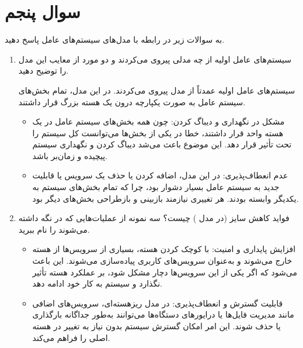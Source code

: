 \section{سوال پنجم}

به سوالات زیر در رابطه با مدل‌های سیستم‌های عامل پاسخ دهید.

\begin{enumerate}
	\item 
	سیستم‌های عامل اولیه از چه مدلی پیروی می‌کردند و دو مورد از معایب این مدل را توضیح دهید.
	\begin{qsolve}
		سیستم‌های عامل اولیه عمدتاً از مدل  پیروی می‌کردند. در این مدل، تمام بخش‌های سیستم عامل به صورت یکپارچه درون یک هسته بزرگ قرار داشتند.
		
		\begin{itemize}
			\item 
			مشکل در نگهداری و دیباگ کردن: چون همه بخش‌های سیستم عامل در یک هسته واحد قرار داشتند، خطا در یکی از بخش‌ها می‌توانست کل سیستم را تحت تأثیر قرار دهد. این موضوع باعث می‌شد دیباگ کردن و نگهداری سیستم پیچیده و زمان‌بر باشد.
			
			\item 
			عدم انعطاف‌پذیری: در این مدل، اضافه کردن یا حذف یک سرویس یا قابلیت جدید به سیستم عامل بسیار دشوار بود، چرا که تمام بخش‌های سیستم به یکدیگر وابسته بودند. هر تغییری نیازمند بازبینی و بازطراحی بخش‌های دیگر بود.
		\end{itemize}
		
	\end{qsolve}
	
	
	\item 
	فواید کاهش سایز  (در مدل ) چیست؟ سه نمونه از عملیات‌هایی که در  نگه داشته می‌شوند را نام ببرید.
	
	\begin{qsolve}
		\begin{itemize}
			\item 
			افزایش پایداری و امنیت: با کوچک کردن هسته، بسیاری از سرویس‌ها از هسته خارج می‌شوند و به‌عنوان سرویس‌های کاربری پیاده‌سازی می‌شوند. این باعث می‌شود که اگر یکی از این سرویس‌ها دچار مشکل شود، بر عملکرد هسته تأثیر نگذارد و سیستم به کار خود ادامه دهد.
			
			\item 
			قابلیت گسترش و انعطاف‌پذیری: در مدل ریزهسته‌ای، سرویس‌های اضافی مانند مدیریت فایل‌ها یا درایورهای دستگاه‌ها می‌توانند به‌طور جداگانه بارگذاری یا حذف شوند. این امر امکان گسترش سیستم بدون نیاز به تغییر در هسته اصلی را فراهم می‌کند.
			

\end{itemize}
\end{qsolve}
\end{enumerate}
